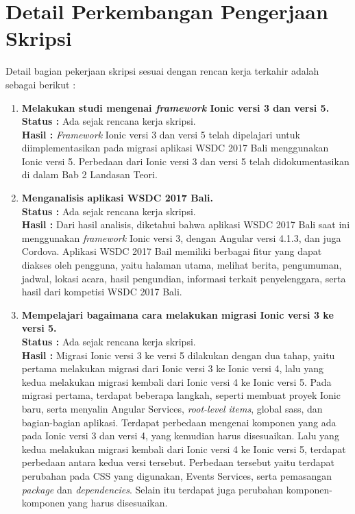 \documentclass[a4paper,twoside]{article}
\begin{document}
\section{Detail Perkembangan Pengerjaan Skripsi}
Detail bagian pekerjaan skripsi sesuai dengan rencan kerja terkahir adalah sebagai berikut :	
	\begin{enumerate}
		\item \textbf{Melakukan studi mengenai \textit{framework} Ionic versi 3 dan versi 5.} \\
		{\bf Status :} Ada sejak rencana kerja skripsi.\\
		{\bf Hasil :} \textit{Framework} Ionic versi 3 dan versi 5 telah dipelajari untuk diimplementasikan pada migrasi aplikasi WSDC 2017 Bali menggunakan Ionic versi 5. Perbedaan dari Ionic versi 3 dan versi 5 telah didokumentasikan di dalam Bab 2 Landasan Teori.
		
		\item \textbf{Menganalisis aplikasi WSDC 2017 Bali.}\\
		{\bf Status :} Ada sejak rencana kerja skripsi.\\
		{\bf Hasil :} Dari hasil analisis, diketahui bahwa aplikasi WSDC 2017 Bali saat ini menggunakan \textit{framework} Ionic versi 3, dengan Angular versi 4.1.3, dan juga Cordova. Aplikasi WSDC 2017 Bail memiliki berbagai fitur yang dapat diakses oleh pengguna, yaitu halaman utama, melihat berita, pengumuman, jadwal, lokasi acara, hasil pengundian, informasi terkait penyelenggara, serta hasil dari kompetisi WSDC 2017 Bali. 
		
		\item \textbf{Mempelajari bagaimana cara melakukan migrasi Ionic versi 3 ke versi 5.}\\
		{\bf Status :} Ada sejak rencana kerja skripsi.\\
		{\bf Hasil :} Migrasi Ionic versi 3 ke versi 5 dilakukan dengan dua tahap, yaitu pertama melakukan migrasi dari Ionic versi 3 ke Ionic versi 4, lalu yang kedua melakukan migrasi kembali dari Ionic versi 4 ke Ionic versi 5. Pada migrasi pertama, terdapat beberapa langkah, seperti membuat proyek Ionic baru, serta menyalin Angular Services, \textit{root-level items}, global sass, dan bagian-bagian aplikasi. Terdapat perbedaan mengenai komponen yang ada pada Ionic versi 3 dan versi 4, yang kemudian harus disesuaikan. Lalu yang kedua melakukan migrasi kembali dari Ionic versi 4 ke Ionic versi 5, terdapat perbedaan antara kedua versi tersebut. Perbedaan tersebut yaitu terdapat perubahan pada CSS yang digunakan, Events Services, serta pemasangan \textit{package} dan \textit{dependencies}. Selain itu terdapat juga perubahan komponen-komponen yang harus disesuaikan.
		

\end{enumerate}
\end{document}
